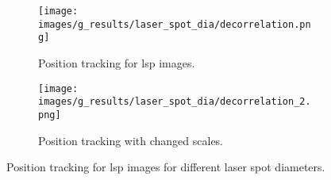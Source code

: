     \begin{figure}[ht]
        \centering
        \begin{subfigure}[b]{0.65\textwidth}
            \centering
            \texttt{[image: images/g\_results/laser\_spot\_dia/decorrelation.png]}
            \caption{Position tracking for \gls{lsp} images.}
            \label{subfig:laser_spot_dia/decorrelation.png}
        \end{subfigure}
        
        \vspace{3mm}
        
        \begin{subfigure}[b]{0.65\textwidth}
            \centering
            \texttt{[image: images/g\_results/laser\_spot\_dia/decorrelation\_2.png]}
            \caption{Position tracking with changed scales.}
            \label{subfig:laser_spot_dia/decorrelation_2.png}
        \end{subfigure}
        \caption{Position tracking for \gls{lsp} images for different laser spot diameters.}
        \label{fig:position_tracking}
    \end{figure}



    
\clearpage